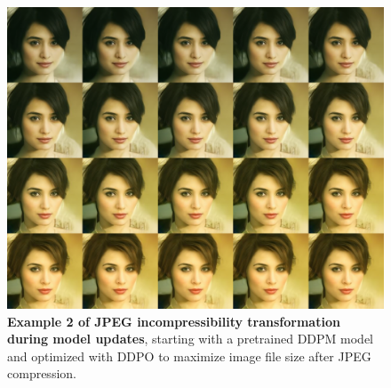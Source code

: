 \begin{appendixs}
        \begin{figure}
            \centering
            \includegraphics[scale=1.40]{img/results/incompressibility_28.png}
            \vspace{-0pt}  %
            \captionsetup{width=\textwidth} %
            \caption{\textbf{Example 2 of JPEG incompressibility transformation during model updates}, starting with a pretrained DDPM model and optimized with DDPO to maximize image file size after JPEG compression.}
            \label{fig:ddpm-to-ddpo-incompressibility-extra2}
        \end{figure}


\end{appendixs}
